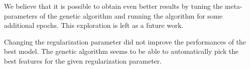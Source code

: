 We believe that it is possible to obtain even better results by tuning the meta-parameters of the genetic algorithm and running the algorithm for some additional epochs.
This exploration is left as a future work.

Changing the regularization parameter did not improve the performances of the best model.
The genetic algorithm seems to be able to automatically pick the best features for the given regularization parameter.
